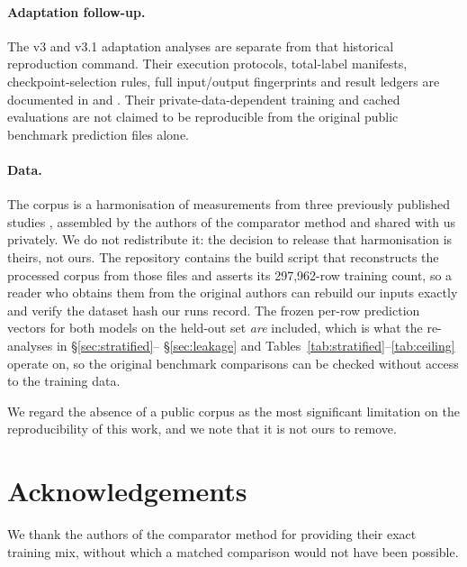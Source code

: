 \documentclass[11pt]{article}
\begin{document}
\paragraph{Adaptation follow-up.} The v3 and v3.1 adaptation analyses are separate
from that historical reproduction command. Their execution protocols, total-label
manifests, checkpoint-selection rules, full input/output fingerprints and result
ledgers are documented in  and
. Their private-data-dependent training and cached
evaluations are not claimed to be reproducible from the original public benchmark
prediction files alone.

\paragraph{Data.} The corpus is a harmonisation of measurements from three previously
published studies \citep{kim2021,mathis2023,yu2023,mathis2024}, assembled by the authors
of the comparator method \citep{hsu2026} and shared with us privately. We do not
redistribute it: the decision to release that harmonisation is theirs, not ours. The
repository contains the build script that reconstructs the processed corpus from those
files and asserts its 297{,}962-row training count, so a reader who obtains them from
the original authors can rebuild our inputs exactly and verify the dataset hash our runs
record. The frozen per-row prediction vectors for both models on the held-out set
\emph{are} included, which is what the re-analyses in \S\ref{sec:stratified}--
\S\ref{sec:leakage} and Tables~\ref{tab:stratified}--\ref{tab:ceiling} operate on, so
the original benchmark comparisons can be checked without access to the training data.

We regard the absence of a public corpus as the most significant limitation on the
reproducibility of this work, and we note that it is not ours to remove.

\section*{Acknowledgements}

We thank the authors of the comparator method for providing their exact training mix,
without which a matched comparison would not have been possible.
\end{document}
